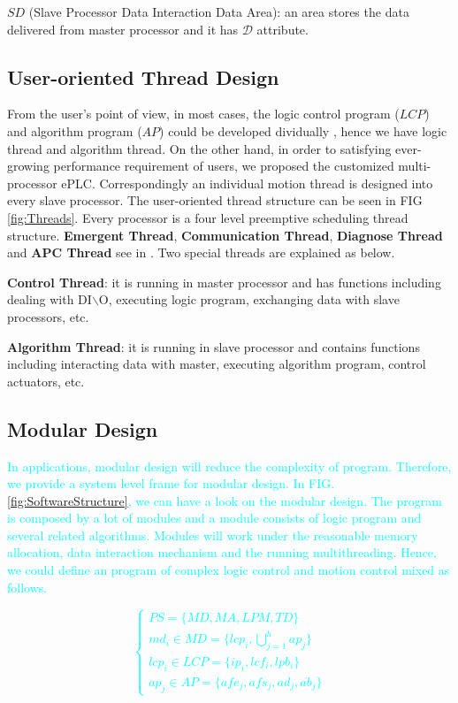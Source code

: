 \documentclass[journal,UTF8]{IEEEtran}
\begin{document}
\textbf{$SD$} (Slave Processor Data Interaction Data Area): an area stores the data delivered from master processor and it has $\mathcal{D}$ attribute.

\subsection{User-oriented Thread Design}
From the user's point of view, in most cases, the logic control program ($LCP$) and algorithm program ($AP$) could be developed dividually \cite{WuA}, hence we have logic thread and algorithm thread. On the other hand, in order to satisfying ever-growing performance requirement of users, we proposed the customized multi-processor ePLC. Correspondingly 
an individual motion thread is designed into every slave processor. The user-oriented thread structure can be seen in FIG \ref{fig:Threads}. Every processor is a four level preemptive scheduling thread structure. \textbf{Emergent Thread}, \textbf{Communication Thread}, \textbf{Diagnose Thread} and \textbf{APC Thread} see in \cite{WuA}. Two special threads are explained as below.

\textbf{Control Thread}: it is running in master processor and has functions including dealing with DI$\backslash$O, executing logic program, exchanging data with slave processors, etc.

\textbf{Algorithm Thread}: it is running in slave processor and contains functions including interacting data with master, executing algorithm program, control actuators, etc.

\subsection{Modular Design}  
\textcolor{cyan}{In applications, modular design will reduce the complexity of program. Therefore, we provide a system level frame for modular design. In FIG. \ref{fig:SoftwareStructure}, we can have a look on the modular design. The program is composed by a lot of modules and a module consists of logic program and several related algorithms. Modules will work under the reasonable memory allocation, data interaction mechanism and the running multithreading. Hence, we could define an program of complex logic control and motion control mixed as follows.}

\textcolor{cyan}{\begin{equation}
	\left\{
	\begin{array}{l}
	PS = \{MD, MA , LPM, TD\}\\
	md_i \in MD = \{lcp_i, \bigcup_{j=1}^h ap_j\}\\
	lcp_i \in LCP = \{ip_i, lcf_i, lpb_i\}\\
	ap_j \in AP = \{afe_j, afs_j, ad_j, ab_j\}
	\end{array}
	\right.
	\end{equation}}
\end{document}

